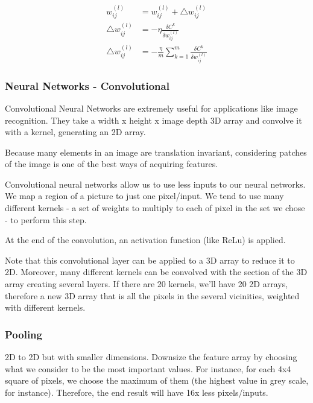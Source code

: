 \begin{align}
    w_{ij}^{(l)} &= w_{ij}^{(l)} + \bigtriangleup w_{ij}^{(l)} \\
    \bigtriangleup w_{ij}^{(l)} &= -\eta \frac{\delta C^k}{\delta w_{ij}^{(l)}} \label{eq1:online} \\
    \bigtriangleup w_{ij}^{(l)} &= -\frac{\eta}{m} \sum_{k=1}^m  \frac{\delta C^k}{\delta w_{ij}^{(l)}} \label{eq2:batch}
\end{align}



\subsubsection{Neural Networks - Convolutional} 

Convolutional Neural Networks are extremely useful for applications like image recognition. They take a width x height x image depth 3D array and convolve it with a kernel, generating an 2D array. 

Because many elements in an image are translation invariant, considering patches of the image is one of the best ways of acquiring features.

Convolutional neural networks allow us to use less inputs to our neural networks. We map a region of a picture to just one pixel/input. We tend to use many different kernels - a set of weights to multiply to each of pixel in the set we chose - to perform this step.




At the end of the convolution, an activation function (like ReLu) is applied.

Note that this convolutional layer can be applied to a 3D array to reduce it to 2D. Moreover, many different kernels can be convolved with the section of the 3D array creating several layers. If there are 20 kernels, we'll have 20 2D arrays, therefore a new 3D array that is all the pixels in the several vicinities, weighted with different kernels.





\subsubsection*{Pooling}
2D to 2D but with smaller dimensions.
Downsize the feature array by choosing what we consider to be the most important values. For instance, for each 4x4 square of pixels, we choose the maximum of them (the highest value in grey scale, for instance). Therefore, the end result will have 16x less pixels/inputs. 

